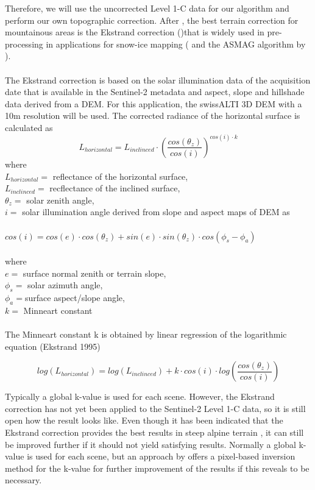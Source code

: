 \documentclass[12pt]{article}
\begin{document}
Therefore, we will use the uncorrected Level 1-C data for our algorithm and perform our own topographic correction. After \cite{Bippus2011}, the best terrain correction for mountainous areas is the Ekstrand correction (\cite{Ekstrand1996})that is widely used in pre-processing in applications for snow-ice mapping (\cite{Paul2016} and the ASMAG algorithm by \cite{Rastner2017}). \\
\\
The Ekstrand correction is based on the solar illumination data of the acquisition date that is available in the Sentinel-2 metadata and aspect, slope and hillshade data derived from a DEM. For this application, the swissALTI 3D DEM with a 10m resolution will be used. The corrected radiance of the horizontal surface is calculated as \\

\begin{equation}
	L_{horizontal} = L_{inclinced}\cdot(\frac{cos(\theta_z)}{cos(i)})^{cos(i)\cdot k}
\end{equation}
where\\
$L_{horizontal}=$ reflectance of the horizontal surface,\\
$L_{inclinced}=$ recflectance of the inclined surface,\\
$\theta_z=$ solar zenith angle,\\
	 $i =$ solar illumination angle derived from slope and aspect maps of DEM as\\
\\
 $cos(i) = cos(e) \cdot cos(\theta_z) + sin(e) \cdot sin(\theta_z) \cdot cos(\phi_s-\phi_a)$\\
	 \\
	 where \\
	 $e =$ surface normal zenith or terrain slope, 
	 \\$\phi_s = $ solar azimuth angle,
	 \\ $\phi_a=$surface aspect/slope angle,
	  \\$k=$ Minneart constant\\
\\
The Minneart constant k is obtained by linear regression of the logarithmic equation (Ekstrand 1995)

\begin{equation}
log(L_{horizontal}) = log (L_{inclinced}) + k \cdot cos(i)\cdot log (\frac{cos(\theta_z)}{cos(i)})
\end{equation}

 Typically a global k-value is used for each scene. However, the Ekstrand correction has not yet been applied to the Sentinel-2 Level 1-C data, so it is still open how the result looks like. Even though it has been indicated that the Ekstrand correction provides the best results in steep alpine terrain \cite{Bippus2011}, it can still be improved further if it should not yield satisfying results.
Normally a global k-value is used for each scene, but an approach by \cite{Lu2008} offers a pixel-based inversion method for the k-value for further improvement of the results if this reveals to be necessary.
 
\end{document}
